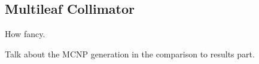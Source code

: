 \subsection{Multileaf Collimator}
How fancy.

Talk about the MCNP generation in the comparison to results part.

\endinput
